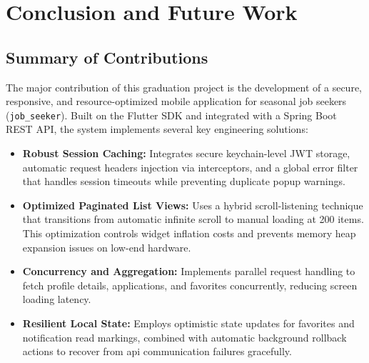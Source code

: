 \chapter{Conclusion and Future Work}
\label{ch:conclusion_and_future_work}

\section{Summary of Contributions}
The major contribution of this graduation project is the development of a secure, responsive, and resource-optimized mobile application for seasonal job seekers (\texttt{job\_seeker}). Built on the Flutter SDK and integrated with a Spring Boot REST API, the system implements several key engineering solutions:
\begin{itemize}
    \item \textbf{Robust Session Caching:} Integrates secure keychain-level JWT storage, automatic request headers injection via interceptors, and a global error filter that handles session timeouts while preventing duplicate popup warnings.
    \item \textbf{Optimized Paginated List Views:} Uses a hybrid scroll-listening technique that transitions from automatic infinite scroll to manual loading at 200 items. This optimization controls widget inflation costs and prevents memory heap expansion issues on low-end hardware.
    \item \textbf{Concurrency and Aggregation:} Implements parallel request handling to fetch profile details, applications, and favorites concurrently, reducing screen loading latency.
    \item \textbf{Resilient Local State:} Employs optimistic state updates for favorites and notification read markings, combined with automatic background rollback actions to recover from api communication failures gracefully.
\end{itemize}

